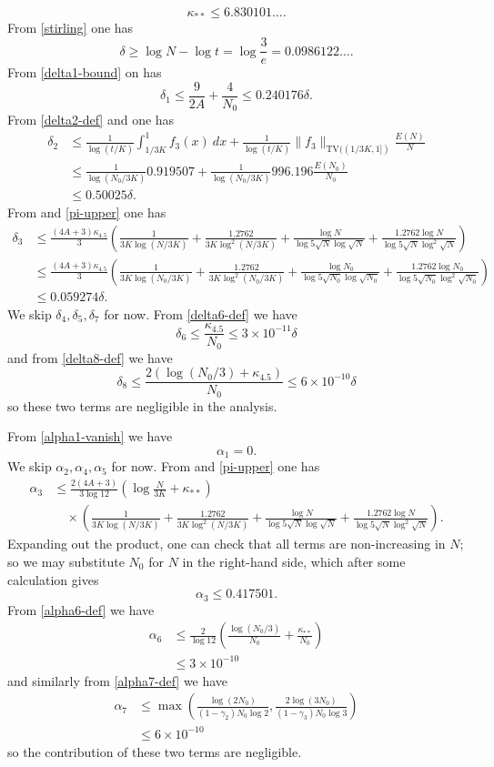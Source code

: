 \documentclass[12pt,a4paper,reqno]{amsart}
\numberwithin{equation}{section}
\theoremstyle{plain}
\theoremstyle{definition}
\begin{document}
$$ \kappa_{**} \leq 6.830101\dots.$$
From \eqref{stirling} one has
$$ \delta \geq \log N - \log t = \log \frac{3}{e} = 0.0986122\dots.$$
From \eqref{delta1-bound} on has
$$ \delta_1 \leq \frac{9}{2A} + \frac{4}{N_0} \leq 0.240176 \delta.$$
From \eqref{delta2-def} and  one has
\begin{align*}
  \delta_2 &\leq \frac{1}{\log(t/K)} \int_{1/3K}^1 f_3(x)\ dx + \frac{1}{\log(t/K)} \|f_3\|_{\mathrm{TV}((1/3K,1])} \frac{E(N)}{N} \\
  &\leq \frac{1}{\log(N_0/3K)} 0.919507 + \frac{1}{\log(N_0/3K)} 996.196 \frac{E(N_0)}{N_0} \\
  &\leq 0.50025 \delta.
\end{align*}
From  and \eqref{pi-upper} one has
\begin{align*}
\delta_3 &\leq \frac{(4A+3)\kappa_{4.5}}{3} \left(
\frac{1}{3K \log(N/3K)} + \frac{1.2762}{3K \log^2(N/3K)}
+ \frac{\log N}{\log 5 \sqrt{N} \log \sqrt{N}} + \frac{1.2762 \log N}{\log 5 \sqrt{N} \log^2 \sqrt{N}} \right) \\
&\leq \frac{(4A+3)\kappa_{4.5}}{3} \left(
  \frac{1}{3K \log(N_0/3K)} + \frac{1.2762}{3K \log^2(N_0/3K)}
  + \frac{\log N_0}{\log 5 \sqrt{N_0} \log \sqrt{N_0}} + \frac{1.2762 \log N_0}{\log 5 \sqrt{N_0} \log^2 \sqrt{N_0}} \right) \\
&\leq 0.059274 \delta.
\end{align*}
We skip $\delta_4, \delta_5, \delta_7$ for now.  From \eqref{delta6-def} we have
$$ \delta_6 \leq \frac{\kappa_{4.5}}{N_0} \leq 3 \times 10^{-11} \delta$$
and from \eqref{delta8-def} we have
$$ \delta_8 \leq \frac{2(\log(N_0/3) + \kappa_{4.5})}{N_0} \leq 6 \times 10^{-10} \delta$$
so these two terms are negligible in the analysis.

From \eqref{alpha1-vanish} we have
$$ \alpha_1 = 0.$$
We skip $\alpha_2, \alpha_4, \alpha_5$ for now.  From  and \eqref{pi-upper} one has
\begin{align*}
  \alpha_3 &\leq \frac{2(4A+3)}{3\log 12} \left(\log \frac{N}{3K} + \kappa_{**}\right)  \\
&\quad \times \left(
  \frac{1}{3K \log(N/3K)} + \frac{1.2762}{3K \log^2(N/3K)}
  + \frac{\log N}{\log 5 \sqrt{N} \log \sqrt{N}} + \frac{1.2762 \log N}{\log 5 \sqrt{N} \log^2 \sqrt{N}} \right).
\end{align*}
Expanding out the product, one can check that all terms are non-increasing in $N$; so we may substitute $N_0$ for $N$ in the right-hand side, which after some calculation gives
$$ \alpha_3 \leq 0.417501.$$
From \eqref{alpha6-def} we have
\begin{align*}
   \alpha_6 &\leq \frac{2}{\log 12} \left( \frac{\log(N_0/3)}{N_0} + \frac{\kappa_{**}}{N_0} \right) \\
   &\leq 3 \times 10^{-10}
\end{align*}
and similarly from \eqref{alpha7-def} we have
\begin{align*}
\alpha_7 &\leq \max\left( \frac{\log(2N_0)}{(1-\gamma_2)N_0\log 2},  \frac{2\log(3N_0)}{(1-\gamma_3)N_0\log 3}\right) \\
&\leq 6 \times 10^{-10}
\end{align*}
so the contribution of these two terms are negligible.
\end{document}
